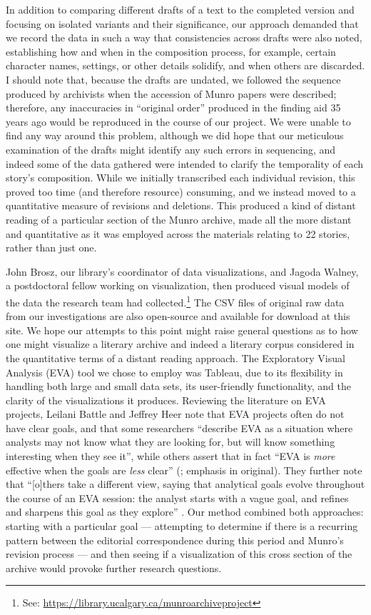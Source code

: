 \begin{paper}
In addition to comparing different drafts of a text to the completed
version and focusing on isolated variants and their significance, our
approach demanded that we record the data in such a way that
consistencies across drafts were also noted, establishing how and when
in the composition process, for example, certain character names,
settings, or other details solidify, and when others are discarded. I
should note that, because the drafts are undated, we followed the
sequence produced by archivists when the accession of Munro papers were
described; therefore, any inaccuracies in ``original order'' produced in
the finding aid 35 years ago would be reproduced in the course of our
project. We were unable to find any way around this problem, although we
did hope that our meticulous examination of the drafts might identify
any such errors in sequencing, and indeed some of the data gathered were
intended to clarify the temporality of each story's composition. While
we initially transcribed each individual revision, this proved too time
(and therefore resource) consuming, and we instead moved to a
quantitative measure of revisions and deletions. This produced a kind of
distant reading of a particular section of the Munro archive, made all
the more distant and quantitative as it was employed across the
materials relating to 22 stories, rather than just one.

John Brosz, our library's coordinator of data visualizations, and Jagoda
Walney, a postdoctoral fellow working on visualization, then produced
visual models of the data the research team had collected.\footnote{See: \url{https://library.ucalgary.ca/munroarchiveproject}} 
The CSV files of original raw data from our investigations are also
open-source and available for download at this site. We hope our
attempts to this point might raise general questions as to how one might
visualize a literary archive and indeed a literary corpus considered in
the quantitative terms of a distant reading approach. The Exploratory
Visual Analysis (EVA) tool we chose to employ was Tableau, due to its
flexibility in handling both large and small data sets, its
user-friendly functionality, and the clarity of the visualizations it
produces. Reviewing the literature on EVA projects, Leilani Battle and
Jeffrey Heer note that EVA projects often do not have clear goals, and
that some researchers ``describe EVA as a situation where analysts may
not know what they are looking for, but will know something interesting
when they see it'', while others assert that in fact ``EVA is
\emph{more} effective when the goals are \emph{less} clear'' (\cite[147]{battle_characterizing_2019};
emphasis in original). They further note that ``{[}o{]}thers take a
different view, saying that analytical goals evolve throughout the
course of an EVA session: the analyst starts with a vague goal, and
refines and sharpens this goal as they explore'' \citep[147]{battle_characterizing_2019}. Our method
combined both approaches: starting with a particular goal –– attempting
to determine if there is a recurring pattern between the editorial
correspondence during this period and Munro's revision process –– and
then seeing if a visualization of this cross section of the archive
would provoke further research questions.


\end{paper}
